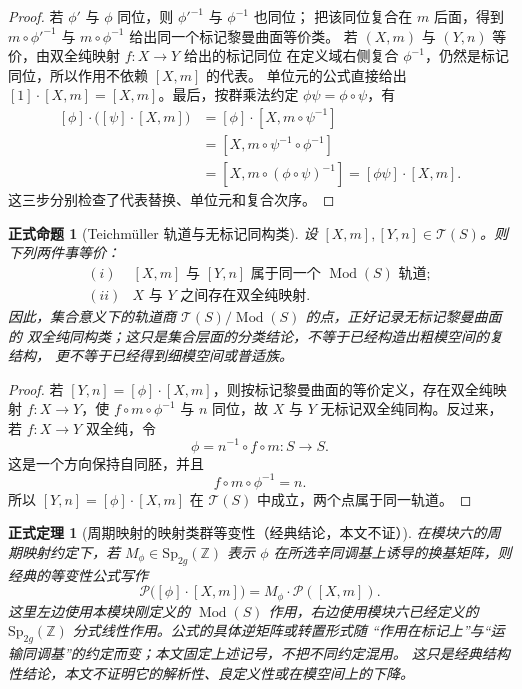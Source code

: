 \documentclass[UTF8,fontset=none,a4paper,11pt]{ctexart}
\theoremstyle{foundation-definition}
\theoremstyle{foundation-theorem}
\newtheorem{theorem}[definition]{正式定理}
\theoremstyle{foundation-proposition}
\newtheorem{proposition}[definition]{正式命题}
\theoremstyle{foundation-example}
\theoremstyle{foundation-remark}
\theoremstyle{foundation-theorem}
\newcommand{\T}{\mathcal T}
\newcommand{\Mod}{\operatorname{Mod}}
\begin{document}
\begin{proof}
若 \(\phi'\) 与 \(\phi\) 同位，则 \(\phi'^{-1}\) 与 \(\phi^{-1}\) 也同位；
把该同位复合在 \(m\) 后面，得到
\(m\circ\phi'^{-1}\) 与 \(m\circ\phi^{-1}\) 给出同一个标记黎曼曲面等价类。
若 \((X,m)\) 与 \((Y,n)\) 等价，由双全纯映射 \(f:X\to Y\) 给出的标记同位
在定义域右侧复合 \(\phi^{-1}\)，仍然是标记同位，所以作用不依赖 \([X,m]\) 的代表。
单位元的公式直接给出
\([1]\cdot[X,m]=[X,m]\)。最后，按群乘法约定
\(\phi\psi=\phi\circ\psi\)，有
\[
\begin{aligned}
[\phi]\cdot\bigl([\psi]\cdot[X,m]\bigr)
&=[\phi]\cdot[X,m\circ\psi^{-1}]\\
&=[X,m\circ\psi^{-1}\circ\phi^{-1}]\\
&=[X,m\circ(\phi\circ\psi)^{-1}]
=[\phi\psi]\cdot[X,m].
\end{aligned}
\]
这三步分别检查了代表替换、单位元和复合次序。
\end{proof}

\begin{proposition}[Teichmüller 轨道与无标记同构类]\label{prop:teich-orbits-unmarked}
设 \([X,m],[Y,n]\in\T(S)\)。则下列两件事等价：
\[
\begin{array}{ll}
(i)&[X,m]\text{ 与 }[Y,n]\text{ 属于同一个 }\Mod(S)\text{ 轨道};\\
(ii)&X\text{ 与 }Y\text{ 之间存在双全纯映射}.
\end{array}
\]
因此，集合意义下的轨道商 \(\T(S)/\Mod(S)\) 的点，正好记录无标记黎曼曲面的
双全纯同构类；这只是集合层面的分类结论，不等于已经构造出粗模空间的复结构，
更不等于已经得到细模空间或普适族。
\end{proposition}

\begin{proof}
若 \([Y,n]=[\phi]\cdot[X,m]\)，则按标记黎曼曲面的等价定义，存在双全纯映射
\(f:X\to Y\)，使 \(f\circ m\circ\phi^{-1}\) 与 \(n\) 同位，故 \(X\) 与 \(Y\)
无标记双全纯同构。反过来，若 \(f:X\to Y\) 双全纯，令
\[
\phi=n^{-1}\circ f\circ m:S\to S.
\]
这是一个方向保持自同胚，并且
\[
f\circ m\circ\phi^{-1}=n.
\]
所以 \([Y,n]=[\phi]\cdot[X,m]\) 在 \(\T(S)\) 中成立，两个点属于同一轨道。
\end{proof}

\begin{theorem}[周期映射的映射类群等变性（经典结论，本文不证）]
在模块六的周期映射约定下，若 \(M_\phi\in\mathrm{Sp}_{2g}(\mathbb Z)\)
表示 \(\phi\) 在所选辛同调基上诱导的换基矩阵，则经典的等变性公式写作
\[
\mathcal P\bigl([\phi]\cdot[X,m]\bigr)
=M_\phi\cdot\mathcal P([X,m]).
\]
这里左边使用本模块刚定义的 \(\Mod(S)\) 作用，右边使用模块六已经定义的
\(\mathrm{Sp}_{2g}(\mathbb Z)\) 分式线性作用。公式的具体逆矩阵或转置形式随
“作用在标记上”与“运输同调基”的约定而变；本文固定上述记号，不把不同约定混用。
这只是经典结构性结论，本文不证明它的解析性、良定义性或在模空间上的下降。
\end{theorem}
\end{document}
